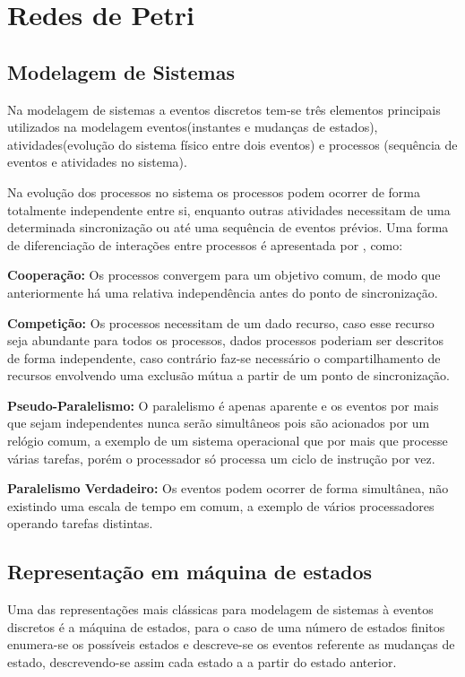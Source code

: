 \chapter{Redes de Petri}
\section{Modelagem de Sistemas}
Na modelagem de sistemas a eventos discretos tem-se três elementos principais utilizados na modelagem eventos(instantes e mudanças de estados), atividades(evolução do sistema físico entre dois eventos) e processos (sequência de eventos e atividades no sistema). 

Na evolução dos processos no sistema os processos podem ocorrer de forma totalmente independente entre si, enquanto outras atividades necessitam de uma determinada sincronização ou até uma sequência de eventos prévios. Uma forma de diferenciação de interações entre processos é apresentada por \cite{vallete}, como:

\textbf{Cooperação:} Os processos convergem para um objetivo comum, de modo que anteriormente há uma relativa independência antes do ponto de sincronização.

\textbf{Competição:} Os processos necessitam de um dado recurso, caso esse recurso seja abundante para todos os processos, dados processos poderiam ser descritos de forma independente, caso contrário faz-se necessário o compartilhamento de recursos envolvendo uma exclusão mútua a partir de um ponto de sincronização.

\textbf{Pseudo-Paralelismo:} O paralelismo é apenas aparente e os eventos por mais que sejam independentes nunca serão simultâneos pois são acionados por um relógio comum, a exemplo de um sistema operacional que por mais que processe várias tarefas, porém o processador só processa um ciclo de instrução por vez.

\textbf{Paralelismo Verdadeiro:} Os eventos podem ocorrer de forma simultânea, não existindo uma escala de tempo em comum, a exemplo de vários processadores operando tarefas distintas.

\section{Representação em máquina de estados}
Uma das representações mais clássicas para modelagem de sistemas à eventos discretos é a máquina de estados, para o caso de uma número de estados finitos enumera-se os possíveis estados e descreve-se os eventos referente as mudanças de estado, descrevendo-se assim cada estado a a partir do estado anterior.

